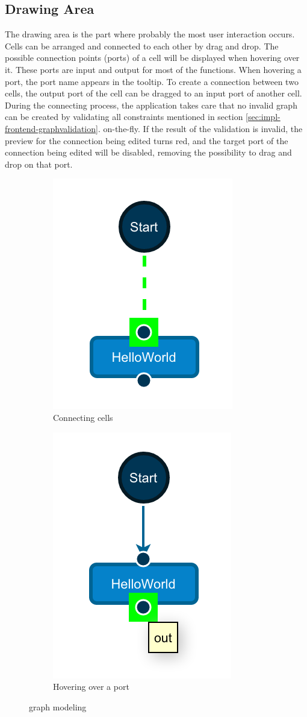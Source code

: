 \documentclass[a4paper,top=25mm,bottom=25mm,12pt,pdftex,halfparskip,twoside,bibtotoc,numbers=noenddot]{scrbook}
\begin{document}
\subsection{Drawing Area}

The drawing area is the part where probably the most user interaction occurs.\\ Cells can be arranged and connected to each other by drag and drop.
The possible connection points (ports) of a cell will be displayed when hovering over it. These ports are input and output for most of the functions.
When hovering a port, the port name appears in the tooltip.
To create a connection between two cells, the output port of the cell can be dragged to an input port of another cell.\\
During the connecting process, the application takes care that no invalid graph can be created by validating all constraints mentioned in section \ref{sec:impl-frontend-graphvalidation}. on-the-fly. If the result of the validation is invalid, the preview for the connection being edited turns red, and the target port of the connection being edited will be disabled, removing the possibility to drag and drop on that port.

\begin{figure}
\centering
\begin{subfigure}{.4\textwidth}
  \centering
  \includegraphics[width=.4\linewidth]{connect}
  \caption{Connecting cells}
\end{subfigure}
\begin{subfigure}{.4\textwidth}
  \centering
  \includegraphics[width=.4\linewidth]{port-hover}
  \caption{Hovering over a port}
\end{subfigure}
\caption{graph modeling}
\label{fig:cell-behaviour}
\end{figure}
\end{document}
